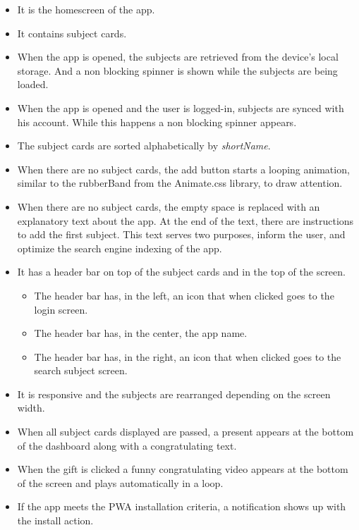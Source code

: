 \begin{itemize}[leftmargin=2cm]
    \item[\nextTask{}\label{req:x}] It is the homescreen of the app.
    \item[\nextTask{}\label{req:x}] It contains subject cards.
    \item[\nextTask{}\label{req:x}] When the app is opened, the subjects are retrieved from the device's local storage. And a non blocking spinner is shown while the subjects are being loaded.
    \item[\nextTask{}\label{req:x}]  When the app is opened and the user is logged-in, subjects are synced with his account. While this happens a non blocking spinner appears.
    \item[\nextTask{}\label{req:x}] The subject cards are sorted alphabetically by \textit{shortName}.
    \item[\nextTask{}\label{req:x}] When there are no subject cards, the add button starts a looping animation, similar to the rubberBand from the Animate.css\cite{animate-css} library, to draw attention.
    \item[\nextTask{}\label{req:x}] When there are no subject cards, the empty space is replaced with an explanatory text about the app. At the end of the text, there are instructions to add the first subject. This text serves two purposes, inform the user, and optimize the search engine indexing of the app.
    \item[\nextTask{}\label{req:x}] It has a header bar on top of the subject cards and in the top of the screen.
    \begin{itemize}[leftmargin=2cm]
        \item[\nextTask{}\label{req:x}] The header bar has, in the left, an icon that when clicked goes to the login screen.
        \item[\nextTask{}\label{req:x}] The header bar has, in the center, the app name.
        \item[\nextTask{}\label{req:x}] The header bar has, in the right, an icon that when clicked goes to the search subject screen.
    \end{itemize}
    \item[\nextTask{}\label{req:x}] It is responsive and the subjects are rearranged depending on the screen width.
    \item[\nextTask{}\label{req:x}] When all subject cards displayed are passed, a present appears at the bottom of the dashboard along with a congratulating text.
    \item[\nextTask{}\label{req:x}] When the gift is clicked a funny congratulating video appears at the bottom of the screen and plays automatically in a loop.
    \item[\nextTask{}\label{req:x}] If the app meets the PWA installation criteria\cite{pwa-install-criteria}, a notification shows up with the install action.
\end{itemize}


